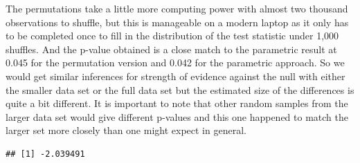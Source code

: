 \documentclass[
]{book}
\newenvironment{Shaded}{\begin{snugshade}}{\end{snugshade}}
\newcommand{\AttributeTok}[1]{\textcolor[rgb]{0.77,0.63,0.00}{#1}}
\newcommand{\ConstantTok}[1]{\textcolor[rgb]{0.00,0.00,0.00}{#1}}
\newcommand{\ControlFlowTok}[1]{\textcolor[rgb]{0.13,0.29,0.53}{\textbf{#1}}}
\newcommand{\DecValTok}[1]{\textcolor[rgb]{0.00,0.00,0.81}{#1}}
\newcommand{\FunctionTok}[1]{\textcolor[rgb]{0.00,0.00,0.00}{#1}}
\newcommand{\NormalTok}[1]{#1}
\newcommand{\OtherTok}[1]{\textcolor[rgb]{0.56,0.35,0.01}{#1}}
\newcommand{\SpecialCharTok}[1]{\textcolor[rgb]{0.00,0.00,0.00}{#1}}
\begin{document}
The permutations take a little more computing power with almost two thousand observations to shuffle, but this is manageable on a modern laptop as it only has to be completed once to fill in the distribution of the test statistic under 1,000 shuffles. And the p-value obtained is a close match to the parametric result at 0.045 for the permutation version and 0.042 for the parametric approach. So we would get similar inferences for strength of evidence against the null with either the smaller data set or the full data set but the estimated size of the differences is quite a bit different. It is important to note that other random samples from the larger data set would give different p-values and this one happened to match the larger set more closely than one might expect in general.

\begin{Shaded}
\end{Shaded}

\begin{verbatim}
## [1] -2.039491
\end{verbatim}

\begin{Shaded}
\end{Shaded}
\end{document}

